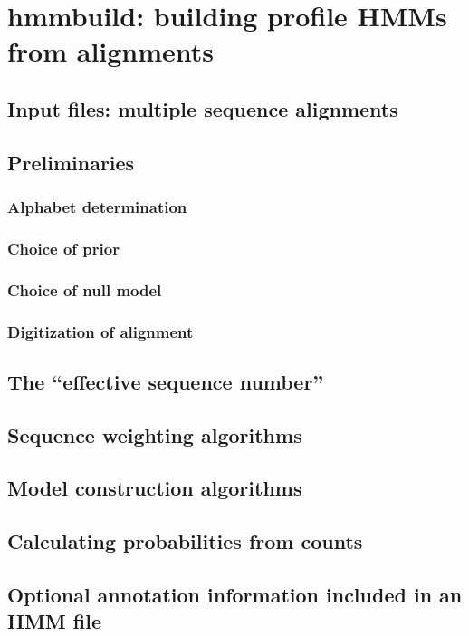 \chapter{hmmbuild: building profile HMMs from alignments}

\section{Input files: multiple sequence alignments}

\section{Preliminaries}

\subsection{Alphabet determination}

\subsection{Choice of prior}

\subsection{Choice of null model}

\subsection{Digitization of alignment}

\section{The ``effective sequence number''}



\section{Sequence weighting algorithms}

\section{Model construction algorithms}

\section{Calculating probabilities from counts}

\section{Optional annotation information included in an HMM file}



